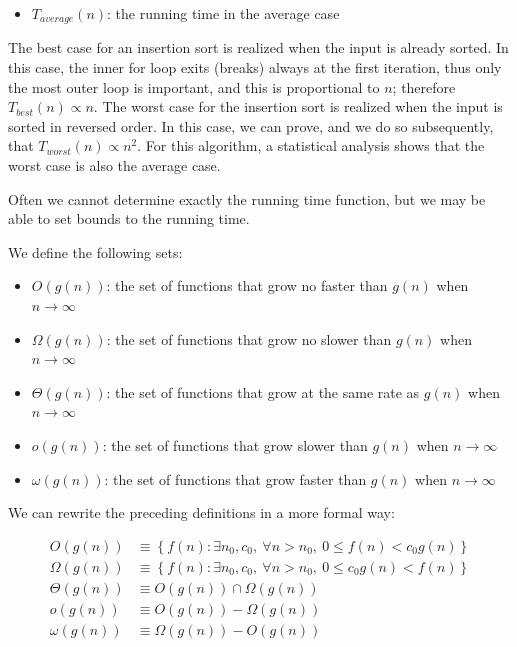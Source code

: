 \documentclass[justified,sixbynine]{tufte-book}
\theoremstyle{plain}%
\theoremstyle{definition}
\theoremstyle{remark}
\begin{document}
\begin{fullwidth}
\begin{itemize}
\item  $T_{average}(n)$: the running time in the average case
\end{itemize}

The best case for an insertion sort is realized when the input is already sorted. In this case, the inner for loop exits (breaks) always at the first iteration, thus only the most outer loop is important, and this is proportional to $n$; therefore $T_{best}(n) \propto n$. The worst case for the insertion sort is realized when the input is sorted in reversed order. In this case, we can prove, and we do so subsequently, that $T_{worst}(n) \propto n^2$. For this algorithm, a statistical analysis shows that the worst case is also the average case.

Often we cannot determine exactly the running time function, but we may be able to set bounds to the running time.

We define the following sets:

\begin{itemize}
\item  $O(g(n))$: the set of functions that grow no faster than $g(n)$ when $%
n\rightarrow \infty $

\item  $\Omega (g(n))$: the set of functions that grow no slower than $g(n)$ when $%
n\rightarrow \infty $

\item  $\Theta (g(n))$: the set of functions that grow at the same rate as $g(n)$ when $%
n\rightarrow \infty $

\item  $o(g(n))$: the set of functions that grow slower than $g(n)$ when $n\rightarrow
\infty $

\item  $\omega (g(n))$: the set of functions that grow faster than $g(n)$ when $n\rightarrow \infty $
\end{itemize}

We can rewrite the preceding definitions in a more formal way:

\begin{align}
O(g(n)) &\equiv \left\{ f(n):\exists n_0,c_0,\ \forall n>n_0,\
0\leq f(n)<c_0g(n)\right\} \\
\Omega (g(n)) &\equiv \left\{ f(n):\exists n_0,c_0,\ \forall
n>n_0,\ 0\leq c_0g(n)<f(n)\right\} \\
\Theta (g(n)) &\equiv O(g(n))\cap \Omega (g(n)) \\
o(g(n)) &\equiv O(g(n))-\Omega (g(n)) \\
\omega (g(n)) &\equiv \Omega (g(n))-O(g(n))
\end{align}


\end{fullwidth}
\end{document}
